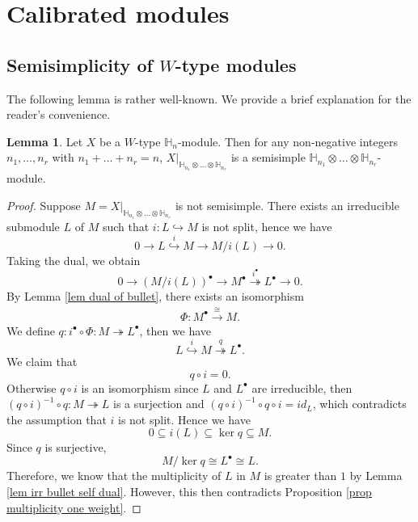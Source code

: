 \documentclass[11pt]{amsart}
\numberwithin{equation}{section}
\theoremstyle{definition}
\newtheorem{lemma}[thm]{Lemma}
\begin{document}
\section{Calibrated modules}\label{sec calibrated mod and skew young diagram}


\subsection{Semisimplicity of $W$-type modules}

The following lemma is rather well-known. We provide a brief explanation for the reader's convenience.

\begin{lemma} \label{lem w semisimple}
Let $X$ be a $W$-type $\mathbb H_n$-module. Then for any non-negative integers $n_1,\ldots, n_r$ with $n_1+\ldots+n_r=n$, $X|_{\mathbb H_{n_1}\otimes \ldots \otimes  \mathbb H_{n_r}}$ is a semisimple \(\mathbb H_{n_1}\otimes \ldots \otimes \mathbb H_{n_r}\)-module. 
\end{lemma}

\begin{proof}
Suppose $M=X|_{\mathbb H_{n_1}\otimes \ldots \otimes \mathbb H_{n_r}}$ is not semisimple. There exists an irreducible submodule $L$ of $M$ such that $i:L\hookrightarrow M$ is not split, hence we have
\[
0\rightarrow L\overset{i}{\hookrightarrow} M\rightarrow M/i(L)\rightarrow 0.
\]
Taking the dual, we obtain
\[
0 \rightarrow (M/i(L))^{\bullet}\rightarrow M^{\bullet} \overset{i^{\bullet}}{\twoheadrightarrow}L^{\bullet}\rightarrow 0.
\]
By Lemma \ref{lem dual of bullet}, there exists an isomorphism
\begin{align} \label{eqn dual restrict}
     \Phi:M^{\bullet}\overset{\cong}{\rightarrow}M.  
\end{align}
We define $q: i^{\bullet}\circ\Phi: M\twoheadrightarrow L^{\bullet}$, then we have
\[
L\overset{i}{\hookrightarrow}M\overset{q}{\twoheadrightarrow}L^{\bullet}.
\]
We claim that 
\[q\circ i=0.\]
Otherwise $q\circ i$ is an isomorphism since $L$ and $L^{\bullet}$ are irreducible, then $(q\circ i)^{-1}\circ q: M\twoheadrightarrow L$ is a surjection and $(q\circ i)^{-1}\circ q\circ i=id_{L}$, which contradicts the assumption that $i$ is not split. Hence we have
\[
0\subseteq i(L)\subseteq\operatorname{ker}q\subseteq M.
\]
Since $q$ is surjective, 
\[
M/\operatorname{ker}q\cong L^{\bullet}\cong L.
\]
Therefore, we know that the multiplicity of $L$ in $M$ is greater than $1$ by
Lemma \ref{lem irr bullet self dual}. However, this then contradicts  Proposition \ref{prop multiplicity one weight}.
\end{proof}
\end{document}
